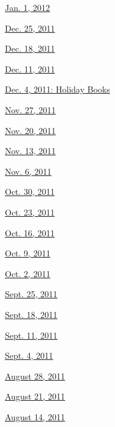\href{http://www.nytimes.com/indexes/2012/01/01/books/review/index.html}{Jan.
1, 2012}

\href{http://www.nytimes.com/indexes/2011/12/25/books/review/index.html}{Dec.
25, 2011}

\href{http://www.nytimes.com/indexes/2011/12/18/books/review/index.html}{Dec.
18, 2011}

\href{http://www.nytimes.com/indexes/2011/12/11/books/review/index.html}{Dec.
11, 2011}

\href{http://www.nytimes.com/indexes/2011/12/04/books/review/index.html}{Dec.
4, 2011: Holiday Books}

\href{http://www.nytimes.com/indexes/2011/11/27/books/review/index.html}{Nov.
27, 2011}

\href{http://www.nytimes.com/indexes/2011/11/20/books/review/index.html}{Nov.
20, 2011}

\href{http://www.nytimes.com/indexes/2011/11/13/books/review/index.html}{Nov.
13, 2011}

\href{http://www.nytimes.com/indexes/2011/11/05/books/review/index.html}{Nov.
6, 2011}

\href{http://www.nytimes.com/indexes/2011/10/28/books/review/index.html}{Oct.
30, 2011}

\href{http://www.nytimes.com/indexes/2011/10/21/books/review/index.html}{Oct.
23, 2011}

\href{http://www.nytimes.com/indexes/2011/10/14/books/review/index.html}{Oct.
16, 2011}

\href{http://www.nytimes.com/indexes/2011/10/07/books/review/index.html}{Oct.
9, 2011}

\href{http://www.nytimes.com/indexes/2011/09/30/books/review/index.html}{Oct.
2, 2011}

\href{http://www.nytimes.com/indexes/2011/09/23/books/review/index.html}{Sept.
25, 2011}

\href{http://www.nytimes.com/indexes/2011/09/16/books/review/index.html}{Sept.
18, 2011}

\href{http://www.nytimes.com/indexes/2011/09/09/books/review/index.html}{Sept.
11, 2011}

\href{http://www.nytimes.com/indexes/2011/09/02/books/review/index.html}{Sept.
4, 2011}

\href{http://www.nytimes.com/indexes/2011/08/26/books/review/index.html}{August
28, 2011}

\href{http://www.nytimes.com/indexes/2011/08/19/books/review/index.html}{August
21, 2011}

\href{http://www.nytimes.com/indexes/2011/08/13/books/review/index.html}{August
14, 2011}

